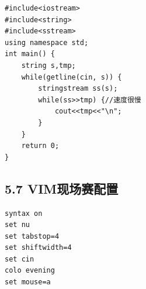 \documentclass[11pt]{article}		%
\begin{document}
\begin{verbatim}
#include<iostream>
#include<string>
#include<sstream>
using namespace std;
int main() {
    string s,tmp;
    while(getline(cin, s)) {
        stringstream ss(s);
        while(ss>>tmp) {//速度很慢
            cout<<tmp<<"\n";
        }
    }
    return 0;
}
\end{verbatim}

\subsection{5.7 VIM现场赛配置}\label{vimux73b0ux573aux8d5bux914dux7f6e}

\begin{verbatim}
syntax on
set nu
set tabstop=4
set shiftwidth=4
set cin
colo evening
set mouse=a
\end{verbatim}
\end{document}
